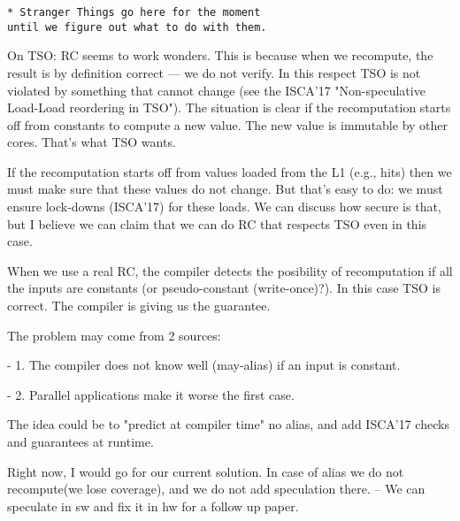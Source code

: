 \begin{verbatim}
* Stranger Things go here for the moment 
until we figure out what to do with them.
 \end{verbatim}


On TSO:
RC seems to work wonders. This is because when we recompute,
the result is by definition correct --- we do not verify.
In this respect TSO is not violated by something that cannot change (see
the ISCA'17 "Non-speculative Load-Load reordering in TSO").
The situation is clear if the recomputation starts off from constants to
compute a new value. The new value is immutable by other cores.
That's what TSO wants.

If the recomputation starts off from values loaded from the L1 (e.g.,
hits) then we must make sure that these values do not change.
But that's easy to do: we must ensure lock-downs (ISCA'17) for these
loads. We can discuss how secure is that, but I believe we can claim
that we can do RC that respects TSO even in this case. 

When we use a real RC, the compiler detects the posibility of recomputation if all the inputs are constants (or pseudo-constant (write-once)?). In this case TSO is correct. The compiler is giving us the guarantee.

The problem may come from 2 sources:

- 1. The compiler does not know well (may-alias) if an input is constant.

- 2. Parallel applications make it worse the first case.

The idea could be to "predict at compiler time" no alias, and add ISCA'17 checks and guarantees at runtime.

Right now, I would go for our current solution. In case of alias we do not recompute(we lose coverage), and we do not add speculation there. -- We can speculate in sw and fix it in hw for a follow up paper.

